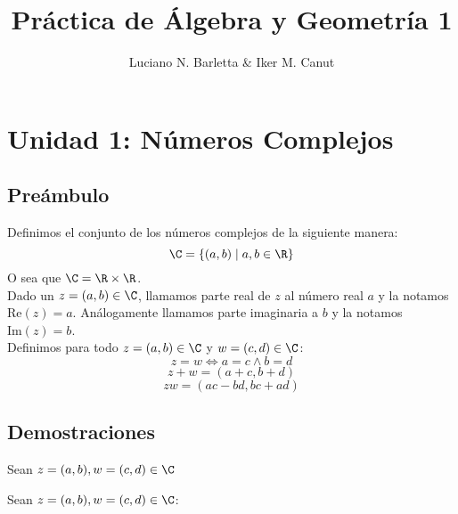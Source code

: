 \documentclass[10pt]{article}
\author{Luciano N. Barletta \& Iker M. Canut}
\begin{document}
\title{Práctica de Álgebra y Geometría 1}
\maketitle
\date
\newpage

\tableofcontents
\newpage

\section{Unidad 1: Números Complejos}

\subsection{Preámbulo}

Definimos el conjunto de los números complejos de la siguiente manera:
$$\C = \{(a,b) \mid a,b \in \R \}$$
O sea que $\C = \R \times \R$.\\

Dado un $z = (a,b) \in \C$, llamamos parte real de $z$ al número real $a$ y la notamos $\text{Re}(z) = a$. Análogamente llamamos parte imaginaria a $b$ y la notamos $\text{Im}(z) = b$.\\
Definimos para todo $z=(a,b) \in \C$ y $w=(c,d) \in \C$:
$$z=w \Leftrightarrow a=c \land b=d$$
$$z+w = (a+c,b+d)$$
$$zw = (ac-bd,bc+ad)$$
\subsection{Demostraciones}

\begin{prf}{}
	Sean $z = (a,b), w = (c,d) \in \C$\\

\end{prf}

\begin{prf}{}
	Sean $z = (a,b), w = (c,d) \in \C$:\\

\end{prf}
\end{document}
